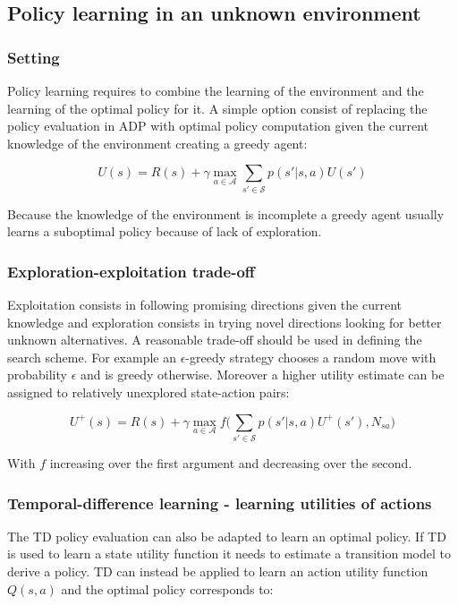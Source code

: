 	\subsection{Policy learning in an unknown environment}

		\subsubsection{Setting}
		Policy learning requires to combine the learning of the environment and the learning of the optimal policy for it.
		A simple option consist of replacing the policy evaluation in ADP with optimal policy computation given the current knowledge of the environment creating a greedy agent:

		$$U(s) = R(s) + \gamma\max\limits_{a\in\mathcal{A}}\sum\limits_{s'\in\mathcal{S}}p(s'|s,a)U(s')$$

		Because the knowledge of the environment is incomplete a greedy agent usually learns a suboptimal policy because of lack of exploration.

		\subsubsection{Exploration-exploitation trade-off}
		Exploitation consists in following promising directions given the current knowledge and exploration consists in trying novel directions looking for better unknown alternatives.
		A reasonable trade-off should be used in defining the search scheme.
		For example an $\epsilon$-greedy strategy chooses a random move with probability $\epsilon$ and is greedy otherwise.
		Moreover a higher utility estimate can be assigned to relatively unexplored state-action pairs:

		$$U^+(s) = R(s) + \gamma\max\limits_{a\in\mathcal{A}}f\biggl(\sum\limits_{s'\in\mathcal{S}}p(s'|s,a)U^+(s'),N_{sa}\biggr)$$

		With $f$ increasing over the first argument and decreasing over the second.
	
		\subsubsection{Temporal-difference learning - learning utilities of actions}
		The TD policy evaluation can also be adapted to learn an optimal policy.
		If TD is used to learn a state utility function it needs to estimate a transition model to derive a policy.
		TD can instead be applied to learn an action utility function $Q(s,a)$ and the optimal policy corresponds to:


